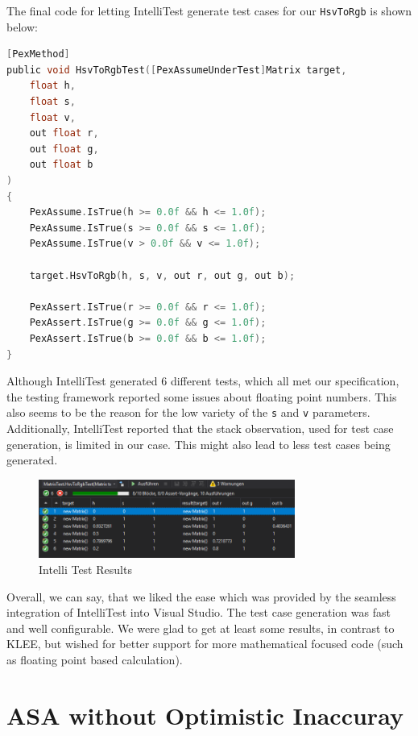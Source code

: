 \documentclass{scrreprt}
\begin{document}
The final code for letting IntelliTest generate test cases for our \texttt{HsvToRgb} is shown below:

\bigskip
\begin{lstlisting}[language=C]
[PexMethod]
public void HsvToRgbTest([PexAssumeUnderTest]Matrix target,
	float h,
	float s,
	float v,
	out float r,
	out float g,
	out float b
)
{
	PexAssume.IsTrue(h >= 0.0f && h <= 1.0f);
	PexAssume.IsTrue(s >= 0.0f && s <= 1.0f);
	PexAssume.IsTrue(v > 0.0f && v <= 1.0f);
	
	target.HsvToRgb(h, s, v, out r, out g, out b);
	
	PexAssert.IsTrue(r >= 0.0f && r <= 1.0f);
	PexAssert.IsTrue(g >= 0.0f && g <= 1.0f);
	PexAssert.IsTrue(b >= 0.0f && b <= 1.0f);
}
\end{lstlisting}
\bigskip

Although IntelliTest generated 6 different tests, which all met our specification, the testing framework reported some issues about floating point numbers. This also seems to be the reason for the low variety of the \texttt{s} and \texttt{v} parameters. Additionally, IntelliTest reported that the stack observation, used for test case generation, is limited in our case. This might also lead to less test cases being generated.

\begin{figure}[h]
	\centering
	\includegraphics[width=0.75\textwidth]{img/matrix_intelli_test.PNG}
	\caption[Intelli Test Results]{Intelli Test Results}
	\label{fig:matrix_intelli_test}
\end{figure}
\bigskip

Overall, we can say, that we liked the ease which was provided by the seamless integration of IntelliTest into Visual Studio. The test case generation was fast and well configurable. We were glad to get at least some results, in contrast to KLEE, but wished for better support for more mathematical focused code (such as floating point based calculation).

\section{ASA without Optimistic Inaccuray}
\end{document}
